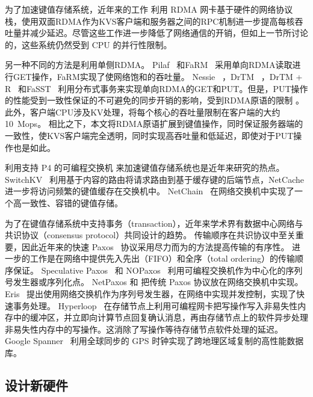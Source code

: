 为了加速键值存储系统，近年来的工作 \cite {kalia2014using,kalia2016design,kalia2014using,kalia2016design} 利用 RDMA 网卡基于硬件的网络协议栈，使用双面RDMA作为KVS客户端和服务器之间的RPC机制进一步提高每核吞吐量并减少延迟。尽管这些工作进一步降低了网络通信的开销，但如上一节所讨论的，这些系统仍然受到 CPU 的并行性限制。

另一种不同的方法是利用单侧RDMA。 Pilaf~ \cite {mitchell2013using} 和FaRM~ \cite {dragojevic2014farm} 采用单向RDMA读取进行GET操作，FaRM实现了使网络饱和的吞吐量。 Nessie~ \cite {szepesi2014designing}，DrTM~ \cite {wei2015fast}，DrTM + R~ \cite {chen2016fast} 和FaSST~ \cite {kalia2016fasst} 利用分布式事务来实现单向RDMA的GET和PUT。但是，PUT操作的性能受到一致性保证的不可避免的同步开销的影响，受到RDMA原语的限制 \cite {kalia2016design}。此外，客户端CPU涉及KV处理，将每个核心的吞吐量限制在客户端的大约10~Mops。
相比之下，本文将RDMA原语扩展到键值操作，同时保证服务器端的一致性，使KVS客户端完全透明，同时实现高吞吐量和低延迟，即使对于PUT操作也是如此。

利用支持 P4 \cite{bosshart2014p4} 的可编程交换机 \cite{barefoot-tofino} 来加速键值存储系统也是近年来研究的热点。
SwitchKV~\cite {li2016fast} 利用基于内容的路由将请求路由到基于缓存键的后端节点，NetCache~ \cite {netcache-sosp17} 进一步将访问频繁的键值缓存在交换机中。
NetChain~\cite{jin2018netchain} 在网络交换机中实现了一个高一致性、容错的键值存储。

为了在键值存储系统中支持事务（transaction），近年来学术界有数据中心网络与共识协议（consensus protocol）共同设计的趋势。
传输顺序在共识协议中至关重要，因此近年来的快速 Paxos~\cite{lamport2006fast,kemme1999processing,moraru2013there,pedone1998optimistic} 协议采用尽力而为的方法提高传输的有序性。
进一步的工作是在网络中提供先入先出（FIFO）和全序（total ordering）的传输顺序保证。
Speculative Paxos~\cite{ports2015designing} 和 NOPaxos~\cite{li2016just} 利用可编程交换机作为中心化的序列号发生器或序列化点。
NetPaxos \cite{dang2015netpaxos,dang2016paxos} 和 \cite{dang2016network} 把传统 Paxos 协议放在网络交换机中实现。
Eris~\cite{eris} 提出使用网络交换机作为序列号发生器，在网络中实现并发控制，实现了快速事务处理。
Hyperloop~\cite{kim2018hyperloop} 在存储节点上利用可编程网卡把写操作写入非易失性内存中的缓冲区，并立即向计算节点回复确认消息，再由存储节点上的软件异步处理非易失性内存中的写操作。这消除了写操作等待存储节点软件处理的延迟。
Google Spanner~\cite{corbett2013spanner} 利用全球同步的 GPS 时钟实现了跨地理区域复制的高性能数据库。



\subsection{设计新硬件}

